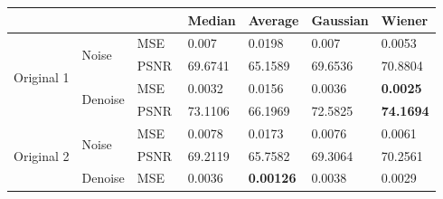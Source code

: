 \begin{center}


\begin{tabular}{llllllllllll|l|l|l|l|l|l|l|l|l|l|l|l|l|}
\cline{13-25}
           &            &            &            &            &            &          &          &       &      &      &     & \multicolumn{3}{l|}{Median}  & \multicolumn{3}{l|}{Average}          & \multicolumn{4}{l|}{Gaussian} & \multicolumn{3}{l|}{Wiener}           \\ \hline
\multicolumn{4}{|l|}{\multirow{4}{*}{Original 1}} & \multicolumn{4}{l|}{\multirow{2}{*}{Noise}}   & \multicolumn{4}{l|}{MSE}  & \multicolumn{3}{l|}{0.007}   & \multicolumn{3}{l|}{0.0198}           & \multicolumn{4}{l|}{0.007}    & \multicolumn{3}{l|}{0.0053}           \\ \cline{9-25} 
\multicolumn{4}{|l|}{}                            & \multicolumn{4}{l|}{}                         & \multicolumn{4}{l|}{PSNR} & \multicolumn{3}{l|}{69.6741} & \multicolumn{3}{l|}{65.1589}          & \multicolumn{4}{l|}{69.6536}  & \multicolumn{3}{l|}{70.8804}          \\ \cline{5-25} 
\multicolumn{4}{|l|}{}                            & \multicolumn{4}{l|}{\multirow{2}{*}{Denoise}} & \multicolumn{4}{l|}{MSE}  & \multicolumn{3}{l|}{0.0032}  & \multicolumn{3}{l|}{0.0156}           & \multicolumn{4}{l|}{0.0036}   & \multicolumn{3}{l|}{\textbf{0.0025}}  \\ \cline{9-25} 
\multicolumn{4}{|l|}{}                            & \multicolumn{4}{l|}{}                         & \multicolumn{4}{l|}{PSNR} & \multicolumn{3}{l|}{73.1106} & \multicolumn{3}{l|}{66.1969}          & \multicolumn{4}{l|}{72.5825}  & \multicolumn{3}{l|}{\textbf{74.1694}} \\ \hline
\multicolumn{4}{|l|}{\multirow{4}{*}{Original 2}} & \multicolumn{4}{l|}{\multirow{2}{*}{Noise}}   & \multicolumn{4}{l|}{MSE}  & \multicolumn{3}{l|}{0.0078}  & \multicolumn{3}{l|}{0.0173}           & \multicolumn{4}{l|}{0.0076}   & \multicolumn{3}{l|}{0.0061}           \\ \cline{9-25} 
\multicolumn{4}{|l|}{}                            & \multicolumn{4}{l|}{}                         & \multicolumn{4}{l|}{PSNR} & \multicolumn{3}{l|}{69.2119} & \multicolumn{3}{l|}{65.7582}          & \multicolumn{4}{l|}{69.3064}  & \multicolumn{3}{l|}{70.2561}          \\ \cline{5-25} 
\multicolumn{4}{|l|}{}                            & \multicolumn{4}{l|}{\multirow{2}{*}{Denoise}} & \multicolumn{4}{l|}{MSE}  & \multicolumn{3}{l|}{0.0036}  & \multicolumn{3}{l|}{\textbf{0.00126}} & \multicolumn{4}{l|}{0.0038}   & \multicolumn{3}{l|}{0.0029}           \\ \cline{9-25} 

\end{tabular}
\end{center}
